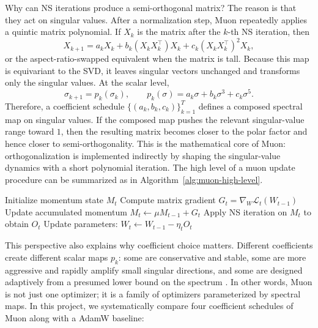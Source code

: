 \documentclass[10pt]{article}
\begin{document}
Why can NS iterations produce a semi-orthogonal matrix? The reason is that they act on singular values. After a normalization step, Muon repeatedly applies a quintic matrix polynomial. If $X_k$ is the matrix after the $k$-th NS iteration, then
\begin{equation}
    X_{k+1} = a_k X_k + b_k (X_k X_k^\top) X_k + c_k (X_k X_k^\top)^2 X_k,
\end{equation}
or the aspect-ratio-swapped equivalent when the matrix is tall. Because this map is equivariant to the SVD, it leaves singular vectors unchanged and transforms only the singular values. At the scalar level,
\begin{equation}
    \sigma_{k+1} = p_k(\sigma_k), \qquad
    p_k(\sigma)=a_k \sigma + b_k \sigma^3 + c_k \sigma^5.
\end{equation}
Therefore, a coefficient schedule $\{(a_k,b_k,c_k)\}_{k=1}^{T}$ defines a composed spectral map on singular values. If the composed map pushes the relevant singular-value range toward $1$, then the resulting matrix becomes closer to the polar factor and hence closer to semi-orthogonality. This is the mathematical core of Muon: orthogonalization is implemented indirectly by shaping the singular-value dynamics with a short polynomial iteration. The high level of a muon update procedure can be summarized as in Algorithm~\ref{alg:muon-high-level}.

\begin{algorithm}[htbp]
\caption{Muon update procedure}
\label{alg:muon-high-level}
\small
\begin{algorithmic}[1]
\State Initialize momentum state $M_t$
    \State Compute matrix gradient $G_t=\nabla_W \mathcal{L}_t(W_{t-1})$
    \State Update accumulated momentum $M_t \leftarrow \mu M_{t-1} + G_t$
    \State Apply NS iteration on $M_t$ to obtain $O_t$
    \State Update parameters: $W_t \leftarrow W_{t-1} - \eta_t O_t$
\EndFor
\end{algorithmic}
\end{algorithm}

This perspective also explains why coefficient choice matters. Different coefficients create different scalar maps $p_k$: some are conservative and stable, some are more aggressive and rapidly amplify small singular directions, and some are designed adaptively from a presumed lower bound on the spectrum \citep{amsel2025polar}. In other words, Muon is not just one optimizer; it is a family of optimizers parameterized by spectral maps. In this project, we systematically compare four coefficient schedules of Muon along with a AdamW baseline:
\end{document}

